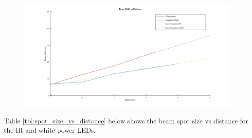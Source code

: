 \begin{figure}[H]
	\centering
	\includegraphics[width=\linewidth]{figures/results/beam_width_vs_distance.png}
	\label{fig:beam_width_vs_distance}
\end{figure}



Table \ref{tbl:spot_size_vs_distance} below shows the beam spot size vs distance for the IR and white power LEDs.

